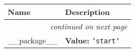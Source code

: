     \vspace{-1cm}
\hspace{\varindent}\begin{longtable}{|p{\varnamewidth}|p{\vardescrwidth}|l}
\cline{1-2}
\cline{1-2} \centering \textbf{Name} & \centering \textbf{Description}& \\
\cline{1-2}
\endhead\cline{1-2}\multicolumn{3}{r}{\small\textit{continued on next page}}\\\endfoot\cline{1-2}
\endlastfoot\raggedright \_\-\_\-p\-a\-c\-k\-a\-g\-e\-\_\-\_\- & \raggedright \textbf{Value:} 
{\tt \texttt{'}\texttt{start}\texttt{'}}&\\
\cline{1-2}
\end{longtable}

